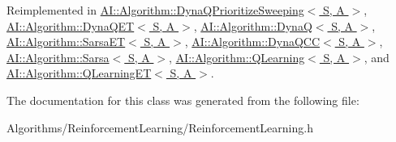 Reimplemented in \hyperlink{classAI_1_1Algorithm_1_1DynaQPrioritizeSweeping_ad08b55f3cf927189dd31abf9fc1c2959}{A\-I\-::\-Algorithm\-::\-Dyna\-Q\-Prioritize\-Sweeping$<$ S, A $>$}, \hyperlink{classAI_1_1Algorithm_1_1DynaQET_a53b0e06842fbb802acfa5384a84ad448}{A\-I\-::\-Algorithm\-::\-Dyna\-Q\-E\-T$<$ S, A $>$}, \hyperlink{classAI_1_1Algorithm_1_1DynaQ_a4542226b17db4ed8a2c5ec17d37dc42f}{A\-I\-::\-Algorithm\-::\-Dyna\-Q$<$ S, A $>$}, \hyperlink{classAI_1_1Algorithm_1_1SarsaET_adf13376b7ec8fdfa2b19ffadb1aa81e7}{A\-I\-::\-Algorithm\-::\-Sarsa\-E\-T$<$ S, A $>$}, \hyperlink{classAI_1_1Algorithm_1_1DynaQCC_ae23b8f0afbb9fc5024aef9ce720c9b84}{A\-I\-::\-Algorithm\-::\-Dyna\-Q\-C\-C$<$ S, A $>$}, \hyperlink{classAI_1_1Algorithm_1_1Sarsa_ae1d62478d3e31cace3fb594e05f83d1c}{A\-I\-::\-Algorithm\-::\-Sarsa$<$ S, A $>$}, \hyperlink{classAI_1_1Algorithm_1_1QLearning_a042e1987ce21a94f59603c4cb1eeed82}{A\-I\-::\-Algorithm\-::\-Q\-Learning$<$ S, A $>$}, and \hyperlink{classAI_1_1Algorithm_1_1QLearningET_a9a245dcb3ca8f26b37e5a6daa6d4a898}{A\-I\-::\-Algorithm\-::\-Q\-Learning\-E\-T$<$ S, A $>$}.



The documentation for this class was generated from the following file\-:\begin{DoxyCompactItemize}
\item 
Algorithms/\-Reinforcement\-Learning/Reinforcement\-Learning.\-h\end{DoxyCompactItemize}
